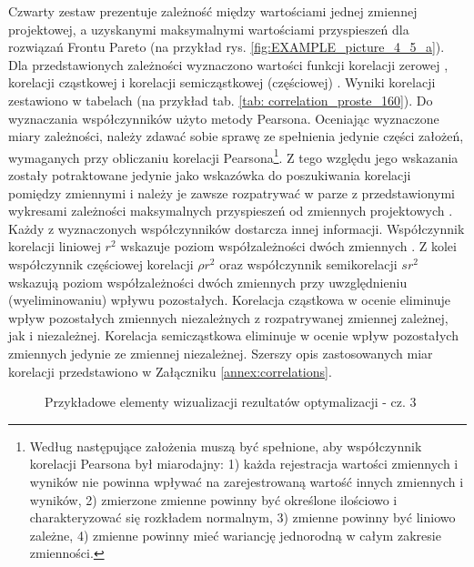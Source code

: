 Czwarty zestaw prezentuje zależność między wartościami jednej zmiennej projektowej, a uzyskanymi maksymalnymi wartościami przyspieszeń dla rozwiązań Frontu Pareto (na przykład rys. \ref{fig:EXAMPLE_picture_4_5_a}). Dla przedstawionych zależności wyznaczono wartości funkcji korelacji zerowej , korelacji cząstkowej  i korelacji semicząstkowej (częściowej)  \parencite{Tabachnick}. Wyniki korelacji zestawiono w tabelach (na przykład tab. \ref{tab: correlation_proste_160}). Do wyznaczania współczynników użyto metody Pearsona. Oceniając wyznaczone miary zależności, należy zdawać sobie sprawę ze spełnienia jedynie części założeń, wymaganych przy obliczaniu korelacji Pearsona\footnote{
	Według \cite{Warner2012} następujące założenia muszą być spełnione, aby współczynnik korelacji Pearsona był miarodajny: 1) każda rejestracja wartości zmiennych i wyników nie powinna wpływać na zarejestrowaną wartość innych zmiennych i wyników, 2) zmierzone zmienne powinny być określone ilościowo i charakteryzować się rozkładem normalnym, 3) zmienne powinny być liniowo zależne, 4) zmienne powinny mieć wariancję jednorodną w całym zakresie zmienności.}.
Z tego względu jego wskazania zostały potraktowane jedynie jako wskazówka do poszukiwania korelacji pomiędzy zmiennymi i należy je zawsze rozpatrywać w parze z przedstawionymi wykresami zależności maksymalnych przyspieszeń od zmiennych projektowych \parencite{Vargha2013}. Każdy z wyznaczonych współczynników dostarcza innej informacji. Współczynnik korelacji liniowej $r^2$ wskazuje poziom współzależności dwóch zmiennych \parencite{Czaja2000}. Z kolei współczynnik częściowej korelacji $\rho r^2$ oraz współczynnik semikorelacji $sr^2$ wskazują poziom współzależności dwóch zmiennych przy uwzględnieniu (wyeliminowaniu) wpływu pozostałych. Korelacja cząstkowa w ocenie eliminuje wpływ pozostałych zmiennych niezależnych z rozpatrywanej zmiennej zależnej, jak i niezależnej. Korelacja semicząstkowa eliminuje w ocenie wpływ pozostałych zmiennych jedynie ze zmiennej niezależnej. 
Szerszy opis zastosowanych miar korelacji przedstawiono w Załączniku \ref{annex:correlations}.
\begin{figure}[hbt!]
	\centering
	\captionsetup{justification=centering}
	\caption{Przykładowe elementy wizualizacji rezultatów optymalizacji - cz. 3}
	\label{fig:EXAMPLE_picture_4_5}
\end{figure}

